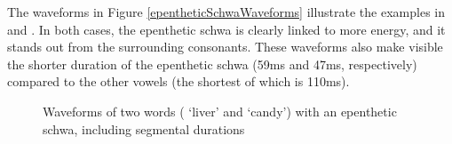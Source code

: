 The waveforms in Figure \vref{epentheticSchwaWaveforms} 
illustrate the examples in   
and . 
In both cases, the epenthetic schwa is clearly linked to more energy, and it stands out from the surrounding consonants. %
These waveforms also make visible the shorter duration of the epenthetic schwa (59ms and 47ms, respectively) compared to the other vowels (the shortest of which is 110ms).
\begin{figure}
\caption[Waveforms of two words with an epenthetic schwa]{Waveforms of two words ( ‘liver’ and  ‘candy’) with an epenthetic schwa, including segmental durations}\label{epentheticSchwaWaveforms}
\end{figure}


